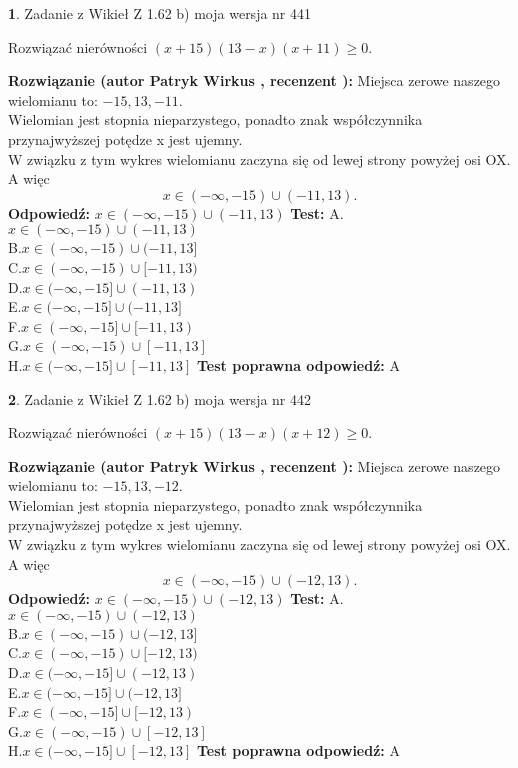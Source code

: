 \documentclass[12pt, a4paper]{article}
\theoremstyle{definition} %
\newtheorem{zad}{}
\newcommand{\zadStart}[1]{\begin{zad}#1\newline}
\newcommand{\zadStop}{\end{zad}}
\newcommand{\rozwStart}[2]{\noindent \textbf{Rozwiązanie (autor #1 , recenzent #2): }\newline}
\newcommand{\rozwStop}{\newline}
\newcommand{\odpStart}{\noindent \textbf{Odpowiedź:}\newline}
\newcommand{\odpStop}{\newline}
\newcommand{\testStart}{\noindent \textbf{Test:}\newline}
\newcommand{\testStop}{\newline}
\newcommand{\kluczStart}{\noindent \textbf{Test poprawna odpowiedź:}\newline}
\newcommand{\kluczStop}{\newline}
\begin{document}
\zadStart{Zadanie z Wikieł Z 1.62 b) moja wersja nr 441}

Rozwiązać nierówności $(x+15)(13-x)(x+11)\ge0$.
\zadStop
\rozwStart{Patryk Wirkus}{}
Miejsca zerowe naszego wielomianu to: $-15, 13, -11$.\\
Wielomian jest stopnia nieparzystego, ponadto znak współczynnika przy\linebreak najwyższej potędze x jest ujemny.\\ W związku z tym wykres wielomianu zaczyna się od lewej strony powyżej osi OX. A więc $$x \in (-\infty,-15) \cup (-11,13).$$
\rozwStop
\odpStart
$x \in (-\infty,-15) \cup (-11,13)$
\odpStop
\testStart
A.$x \in (-\infty,-15) \cup (-11,13)$\\
B.$x \in (-\infty,-15) \cup (-11,13]$\\
C.$x \in (-\infty,-15) \cup [-11,13)$\\
D.$x \in (-\infty,-15] \cup (-11,13)$\\
E.$x \in (-\infty,-15] \cup (-11,13]$\\
F.$x \in (-\infty,-15] \cup [-11,13)$\\
G.$x \in (-\infty,-15) \cup [-11,13]$\\
H.$x \in (-\infty,-15] \cup [-11,13]$
\testStop
\kluczStart
A
\kluczStop



\zadStart{Zadanie z Wikieł Z 1.62 b) moja wersja nr 442}

Rozwiązać nierówności $(x+15)(13-x)(x+12)\ge0$.
\zadStop
\rozwStart{Patryk Wirkus}{}
Miejsca zerowe naszego wielomianu to: $-15, 13, -12$.\\
Wielomian jest stopnia nieparzystego, ponadto znak współczynnika przy\linebreak najwyższej potędze x jest ujemny.\\ W związku z tym wykres wielomianu zaczyna się od lewej strony powyżej osi OX. A więc $$x \in (-\infty,-15) \cup (-12,13).$$
\rozwStop
\odpStart
$x \in (-\infty,-15) \cup (-12,13)$
\odpStop
\testStart
A.$x \in (-\infty,-15) \cup (-12,13)$\\
B.$x \in (-\infty,-15) \cup (-12,13]$\\
C.$x \in (-\infty,-15) \cup [-12,13)$\\
D.$x \in (-\infty,-15] \cup (-12,13)$\\
E.$x \in (-\infty,-15] \cup (-12,13]$\\
F.$x \in (-\infty,-15] \cup [-12,13)$\\
G.$x \in (-\infty,-15) \cup [-12,13]$\\
H.$x \in (-\infty,-15] \cup [-12,13]$
\testStop
\kluczStart
A
\kluczStop
\end{document}
